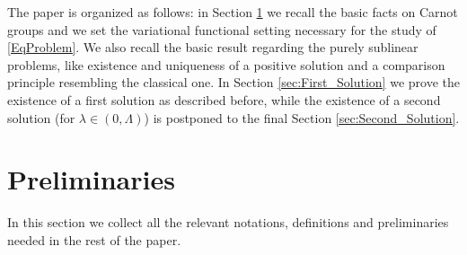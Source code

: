 \documentclass[11pt]{amsart}
\numberwithin{equation}{section} %
\theoremstyle{definition}
\begin{document}
\medskip

The paper is organized as follows: in Section \ref{sec:Prel} we recall the basic facts on Carnot groups and we set the variational functional setting necessary for the study of \eqref{EqProblem}. We also recall the basic result regarding the purely sublinear problems, like existence and uniqueness of a positive solution and a comparison principle resembling the classical one. In Section \ref{sec:First_Solution} we prove the existence of a first solution as described before, while the existence of a second solution (for $\lambda \in (0,\Lambda)$) is postponed to the final Section \ref{sec:Second_Solution}.





\section{Preliminaries}\label{sec:Prel}
In this section we collect all the relevant notations, definitions and preliminaries needed in the rest of the paper.
\end{document}
